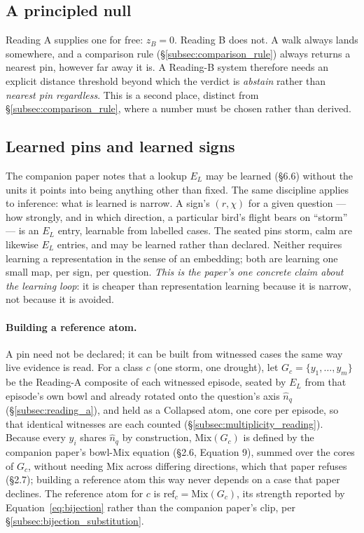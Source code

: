 \documentclass[12pt, a4paper]{article}
\begin{document}
\subsection{A principled null}
\label{subsec:the_null}
Reading A supplies one for free: $z_B=0$. Reading B does not. A walk
always lands somewhere, and a comparison rule (\S\ref{subsec:comparison_rule})
always returns a nearest pin, however far away it is. A Reading-B
system therefore needs an explicit distance threshold beyond which the
verdict is \emph{abstain} rather than \emph{nearest pin regardless}.
This is a second place, distinct from \S\ref{subsec:comparison_rule},
where a number must be chosen rather than derived.

\subsection{Learned pins and learned signs}
\label{subsec:learned_pins}
The companion paper notes that a lookup $E_L$ may be learned
(\S6.6) without the units it points into being anything other than
fixed. The same discipline applies to inference: what is learned is
narrow. A sign's $(r,\chi)$ for a given question --- how strongly, and
in which direction, a particular bird's flight bears on ``storm'' ---
is an $E_L$ entry, learnable from labelled cases. The seated pins
$\mathrm{storm}$, $\mathrm{calm}$ are likewise $E_L$ entries, and may
be learned rather than declared. Neither requires learning a
representation in the sense of an embedding; both are learning one
small map, per sign, per question. \emph{This is the paper's one
concrete claim about the learning loop}: it is cheaper than
representation learning because it is narrow, not because it is
avoided.

\paragraph{Building a reference atom.}
\label{par:reference_atom}
A pin need not be declared; it can be built from witnessed cases the
same way live evidence is read. For a class $c$ (one storm, one
drought), let $G_c=\{y_1,\ldots,y_m\}$ be the Reading-A composite of
each witnessed episode, seated by $E_L$ from that episode's own bowl
and already rotated onto the question's axis $\hat n_q$
(\S\ref{subsec:reading_a}), and held as a Collapsed atom, one core per
episode, so that identical witnesses are each counted
(\S\ref{subsec:multiplicity_reading}). Because every $y_i$ shares $\hat
n_q$ by construction, $\mathrm{Mix}(G_c)$ is defined by the
companion paper's bowl-Mix equation (\S2.6, Equation 9), summed over the
cores of $G_c$, without needing Mix across differing directions, which
that paper refuses (\S2.7); building a reference atom this way never
depends on a case that paper declines. The
reference atom for $c$ is $\mathrm{ref}_c=\mathrm{Mix}(G_c)$, its strength
reported by Equation~\eqref{eq:bijection} rather than the companion
paper's clip, per \S\ref{subsec:bijection_substitution}.
\end{document}
